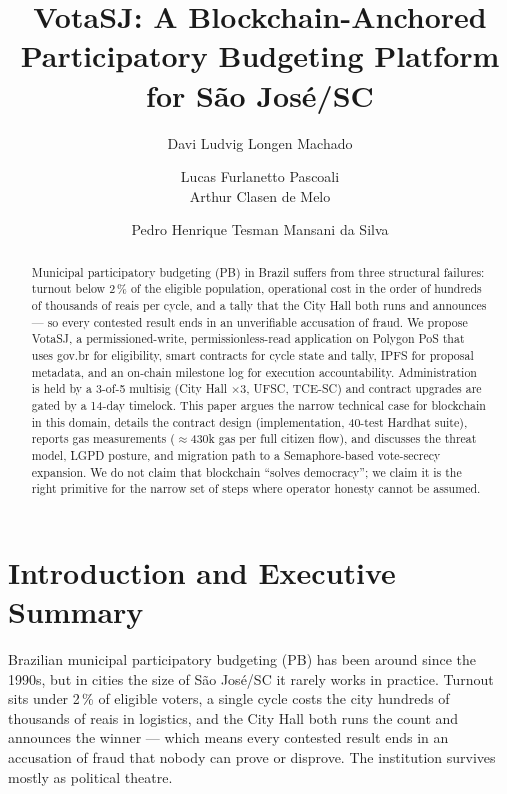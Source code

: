 \documentclass[12pt]{article}
\title{VotaSJ: A Blockchain-Anchored Participatory Budgeting Platform for S\~ao Jos\'e/SC}
\author{Davi Ludvig Longen Machado\inst{1} \and
        Lucas Furlanetto Pascoali\inst{1} \\
        Arthur Clasen de Melo\inst{1} \and
        Pedro Henrique Tesman Mansani da Silva\inst{1}}
\begin{document}
\maketitle

\begin{abstract}
Municipal participatory budgeting (PB) in Brazil suffers from three structural
failures: turnout below 2\,\% of the eligible population, operational cost in
the order of hundreds of thousands of reais per cycle, and a tally that the
City Hall both runs and announces --- so every contested result ends in an
unverifiable accusation of fraud. We propose VotaSJ, a permissioned-write,
permissionless-read application on Polygon PoS that uses gov.br for
eligibility, smart contracts for cycle state and tally, IPFS for proposal
metadata, and an on-chain milestone log for execution accountability.
Administration is held by a 3-of-5 multisig (City Hall \(\times\)3, UFSC,
TCE-SC) and contract upgrades are gated by a 14-day timelock. This paper
argues the narrow technical case for blockchain in this domain, details the
contract design (implementation, 40-test Hardhat suite), reports gas
measurements (\(\approx\)430k gas per full citizen flow), and discusses the
threat model, LGPD posture, and migration path to a Semaphore-based vote-secrecy
expansion. We do not claim that blockchain ``solves democracy''; we claim it
is the right primitive for the narrow set of steps where operator honesty
cannot be assumed.
\end{abstract}


\section{Introduction and Executive Summary}
\label{sec:intro}

Brazilian municipal participatory budgeting (PB) has been around since the
1990s, but in cities the size of S\~ao Jos\'e/SC it rarely works in
practice. Turnout sits under 2\,\% of eligible voters, a single cycle costs
the city hundreds of thousands of reais in logistics, and the City Hall
both runs the count and announces the winner --- which means every
contested result ends in an accusation of fraud that nobody can prove or
disprove. The institution survives mostly as political theatre.
\end{document}
